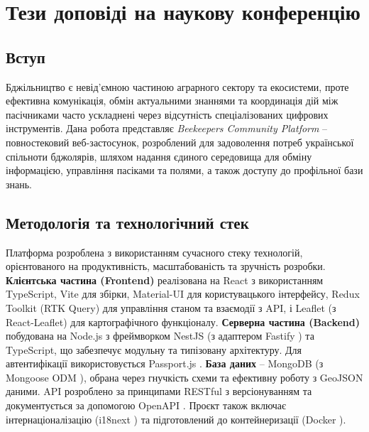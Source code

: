 \section*{Тези доповіді на наукову конференцію}
\label{sec:conference_abstract}

\subsection*{Вступ}
Бджільництво є невід'ємною частиною аграрного сектору та екосистеми, проте ефективна комунікація, обмін актуальними знаннями та координація дій між пасічниками часто ускладнені через відсутність спеціалізованих цифрових інструментів. Дана робота представляє \textit{Beekeepers Community Platform} – повностековий веб-застосунок, розроблений для задоволення потреб української спільноти бджолярів, шляхом надання єдиного середовища для обміну інформацією, управління пасіками та полями, а також доступу до профільної бази знань.

\subsection*{Методологія та технологічний стек}
Платформа розроблена з використанням сучасного стеку технологій, орієнтованого на продуктивність, масштабованість та зручність розробки. 
\textbf{Клієнтська частина (Frontend)} реалізована на React \cite{react} з використанням TypeScript, Vite \cite{vite} для збірки, Material-UI \cite{materialui} для користувацького інтерфейсу, Redux Toolkit (RTK Query) \cite{reduxtoolkit} для управління станом та взаємодії з API, і Leaflet \cite{leaflet} (з React-Leaflet) для картографічного функціоналу. 
\textbf{Серверна частина (Backend)} побудована на Node.js з фреймворком NestJS \cite{nestjs} (з адаптером Fastify \cite{fastify}) та TypeScript, що забезпечує модульну та типізовану архітектуру. Для автентифікації використовується Passport.js \cite{passportjs}.
\textbf{База даних} – MongoDB \cite{mongodb} (з Mongoose ODM \cite{mongoose}), обрана через гнучкість схеми та ефективну роботу з GeoJSON даними.
API розроблено за принципами RESTful з версіонуванням та документується за допомогою OpenAPI \cite{openapi}. Проєкт також включає інтернаціоналізацію (i18next \cite{i18next}) та підготовлений до контейнеризації (Docker \cite{docker}).


